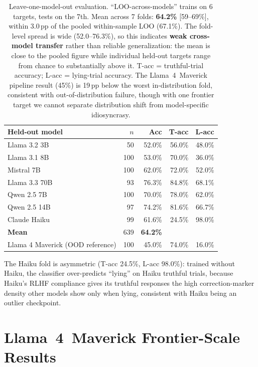 \begin{table}[h]
\centering
\caption{Leave-one-model-out evaluation. ``LOO-across-models'' trains on 6 targets, tests on the 7th. Mean across 7 folds: \textbf{64.2\%} [59--69\%], within 3.0\,pp of the pooled within-sample LOO (67.1\%). The fold-level spread is wide (52.0--76.3\%), so this indicates \textbf{weak cross-model transfer} rather than reliable generalization: the mean is close to the pooled figure while individual held-out targets range from chance to substantially above it. T-acc = truthful-trial accuracy; L-acc = lying-trial accuracy. The Llama~4~Maverick pipeline result (45\%) is 19\,pp below the worst in-distribution fold, consistent with out-of-distribution failure, though with one frontier target we cannot separate distribution shift from model-specific idiosyncrasy.}
\label{tab:loo_across_models}
\begin{tabular}{lrrrr}
\toprule
\textbf{Held-out model} & \textbf{$n$} & \textbf{Acc} & \textbf{T-acc} & \textbf{L-acc} \\
\midrule
Llama 3.2 3B   & 50  & 52.0\% & 56.0\% & 48.0\% \\
Llama 3.1 8B   & 100 & 53.0\% & 70.0\% & 36.0\% \\
Mistral 7B     & 100 & 62.0\% & 72.0\% & 52.0\% \\
Llama 3.3 70B  & 93  & 76.3\% & 84.8\% & 68.1\% \\
Qwen 2.5 7B    & 100 & 70.0\% & 78.0\% & 62.0\% \\
Qwen 2.5 14B   & 97  & 74.2\% & 81.6\% & 66.7\% \\
Claude Haiku   & 99  & 61.6\% & 24.5\% & 98.0\% \\
\midrule
\textbf{Mean} & 639 & \textbf{64.2\%} & & \\
\midrule
Llama 4 Maverick (OOD reference) & 100 & 45.0\% & 74.0\% & 16.0\% \\
\bottomrule
\end{tabular}
\end{table}

The Haiku fold is asymmetric (T-acc 24.5\%, L-acc 98.0\%): trained without Haiku, the classifier over-predicts ``lying'' on Haiku truthful trials, because Haiku's RLHF compliance gives its truthful responses the high correction-marker density other models show only when lying, consistent with Haiku being an outlier checkpoint.

\section{Llama~4~Maverick Frontier-Scale Results}\label{app:llama405b_results}

